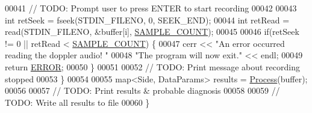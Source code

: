 \begin{DoxyCode}
00041         \textcolor{comment}{// TODO: Prompt user to press ENTER to start recording}
00042 
00043         \textcolor{keywordtype}{int} retSeek = fseek(STDIN\_FILENO, 0, SEEK\_END);
00044         \textcolor{keywordtype}{int} retRead = read(STDIN\_FILENO, &buffer[i], \hyperlink{definitions_8hpp_a1682c770d91c5d167b621a782be940d4}{SAMPLE\_COUNT});
00045 
00046         \textcolor{keywordflow}{if}(retSeek != 0 || retRead < \hyperlink{definitions_8hpp_a1682c770d91c5d167b621a782be940d4}{SAMPLE\_COUNT}) \{
00047             cerr << \textcolor{stringliteral}{"An error occurred reading the doppler audio! "}
00048                 \textcolor{stringliteral}{"The program will now exit."} << endl;
00049             \textcolor{keywordflow}{return} \hyperlink{definitions_8hpp_a8fe83ac76edc595f6b98cd4a4127aed5}{ERROR};
00050         \}
00051 
00052         \textcolor{comment}{// TODO: Print message about recording stopped}
00053     \}
00054 
00055     map<Side, DataParams> results = \hyperlink{namespacevaso_a0a7aa548b31b50c92be5b08bcb1df9a0}{Process}(buffer);
00056 
00057     \textcolor{comment}{// TODO: Print results & probable diagnosis}
00058 
00059     \textcolor{comment}{// TODO: Write all results to file}
00060 \}
\end{DoxyCode}
